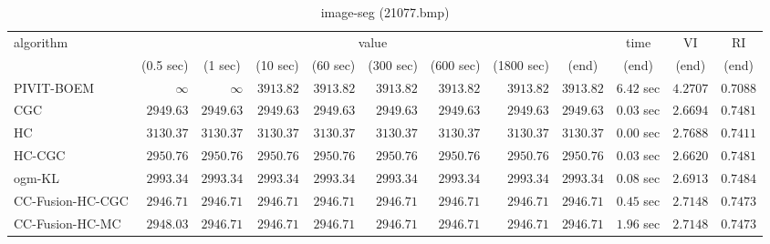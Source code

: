 \begin{table}[H]
\scriptsize
\centering
\caption{image-seg (21077.bmp)}
\label{tab:anytimetable-image-seg-21077.bmp}
\begin{tabular}{lrrrrrrrrrrr}
\toprule
           algorithm &                                   \multicolumn{8}{c}{value} & \multicolumn{1}{c}{time}    & \multicolumn{1}{c}{VI}  & \multicolumn{1}{c}{RI} \\  
\cmidrule(lr){2-9}\cmidrule(lr){10-10} \cmidrule(lr){11-11} \cmidrule(lr){12-12}   
                     & \multicolumn{1}{c}{(0.5 sec)} & \multicolumn{1}{c}{(1 sec)} & \multicolumn{1}{c}{(10 sec)} & \multicolumn{1}{c}{(60 sec)} & \multicolumn{1}{c}{(300 sec)} & \multicolumn{1}{c}{(600 sec)} & \multicolumn{1}{c}{(1800 sec)} & \multicolumn{1}{c}{(end)} & \multicolumn{1}{c}{(end)}    & \multicolumn{1}{c}{(end)}   & \multicolumn{1}{c}{(end)}  \\ \midrule 
          PIVIT-BOEM & $\infty$ & $\infty$ & $      3913.82$ & $      3913.82$ & $      3913.82$ & $      3913.82$ & $      3913.82$ & $      3913.82$ & $         6.42$ sec    & $       4.2707$  & $       0.7088$ \\ 
                 CGC & $      2949.63$ & $      2949.63$ & $      2949.63$ & $      2949.63$ & $      2949.63$ & $      2949.63$ & $      2949.63$ & $      2949.63$ & $         0.03$ sec    & $       2.6694$  & $       0.7481$ \\ 
                  HC & $      3130.37$ & $      3130.37$ & $      3130.37$ & $      3130.37$ & $      3130.37$ & $      3130.37$ & $      3130.37$ & $      3130.37$ & $         0.00$ sec    & $       2.7688$  & $       0.7411$ \\ 
              HC-CGC & $      2950.76$ & $      2950.76$ & $      2950.76$ & $      2950.76$ & $      2950.76$ & $      2950.76$ & $      2950.76$ & $      2950.76$ & $         0.03$ sec    & $       2.6620$  & $       0.7481$ \\ 
              ogm-KL & $      2993.34$ & $      2993.34$ & $      2993.34$ & $      2993.34$ & $      2993.34$ & $      2993.34$ & $      2993.34$ & $      2993.34$ & $         0.08$ sec    & $       2.6913$  & $       0.7484$ \\ 
    CC-Fusion-HC-CGC & $      2946.71$ & $      2946.71$ & $      2946.71$ & $      2946.71$ & $      2946.71$ & $      2946.71$ & $      2946.71$ & $      2946.71$ & $         0.45$ sec    & $       2.7148$  & $       0.7473$ \\ 
     CC-Fusion-HC-MC & $      2948.03$ & $      2946.71$ & $      2946.71$ & $      2946.71$ & $      2946.71$ & $      2946.71$ & $      2946.71$ & $      2946.71$ & $         1.96$ sec    & $       2.7148$  & $       0.7473$ \\ 

\end{tabular}
\end{table}
